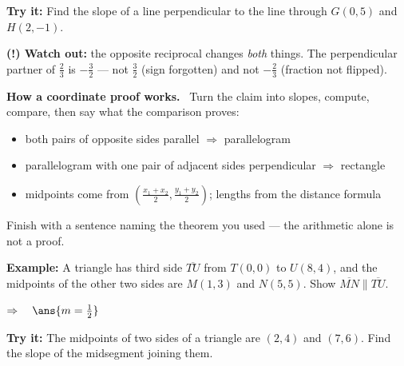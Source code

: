 \documentclass[12pt]{article}
\begin{document}
\begin{tryitbox}
\textbf{Try it:} \quad Find the slope of a line perpendicular to the line through $G(0, 5)$ and $H(2, -1)$.\\[2pt]
\end{tryitbox}

\begin{watchoutbox}
\textbf{(!) Watch out:} the opposite reciprocal changes \emph{both} things. The perpendicular partner of $\tfrac{2}{3}$ is $-\tfrac{3}{2}$ --- not $\tfrac{3}{2}$ (sign forgotten) and not $-\tfrac{2}{3}$ (fraction not flipped).
\end{watchoutbox}


\begin{formulabox}
\textbf{How a coordinate proof works.} \ Turn the claim into slopes, compute, compare, then say what the comparison proves:
\begin{itemize}[leftmargin=0.8cm, itemsep=0pt, topsep=2pt]
  \item both pairs of opposite sides parallel $\Rightarrow$ parallelogram
  \item parallelogram with one pair of adjacent sides perpendicular $\Rightarrow$ rectangle
  \item midpoints come from $\left(\frac{x_1 + x_2}{2}, \frac{y_1 + y_2}{2}\right)$; lengths from the distance formula
\end{itemize}
Finish with a sentence naming the theorem you used --- the arithmetic alone is not a proof.
\end{formulabox}

\begin{examplebox}
\textbf{Example:} \quad A triangle has third side $\overline{TU}$ from $T(0, 0)$ to $U(8, 4)$, and the midpoints of the other two sides are $M(1, 3)$ and $N(5, 5)$. Show $\overline{MN} \parallel \overline{TU}$.


$\Rightarrow\quad \ans{m = \tfrac{1}{2}}$
\end{examplebox}

\begin{tryitbox}
\textbf{Try it:} \quad The midpoints of two sides of a triangle are $(2, 4)$ and $(7, 6)$. Find the slope of the midsegment joining them.\\[2pt]
\end{tryitbox}
\end{document}
